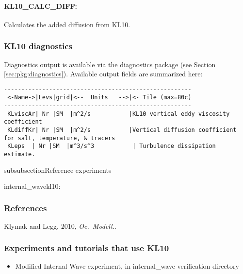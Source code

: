 \paragraph{KL10\_CALC\_DIFF:} Calculates the added diffusion from KL10.

\subsubsection{KL10 diagnostics
\label{sec:pkg:kl10:diagnostics}}

Diagnostics output is available via the diagnostics package
(see Section \ref{sec:pkg:diagnostics}).
Available output fields are summarized here:

\begin{verbatim}
------------------------------------------------------
 <-Name->|Levs|grid|<--  Units   -->|<- Tile (max=80c)
------------------------------------------------------
 KLviscAr| Nr |SM  |m^2/s           |KL10 vertical eddy viscosity coefficient
 KLdiffKr| Nr |SM  |m^2/s           |Vertical diffusion coefficient for salt, temperature, & tracers
 KLeps  | Nr |SM  |m^3/s^3           | Turbulence dissipation estimate.
\end{verbatim}


subsubsection{Reference experiments}

internal\_wavekl10:


\subsubsection{References}

Klymak and Legg, 2010, \emph{Oc.\ Modell.}.

\subsubsection{Experiments and tutorials that use KL10}
\label{sec:pkg:kl10:experiments}

\begin{itemize}
\item{Modified Internal Wave experiment, in internal\_wave verification directory }
\end{itemize}

